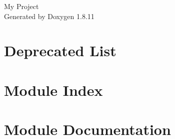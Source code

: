 \documentclass[twoside]{book}
\newcommand{\+}{\discretionary{\mbox{\scriptsize$\hookleftarrow$}}{}{}}
\newcommand{\clearemptydoublepage}{%
  \newpage{\pagestyle{empty}\cleardoublepage}%
}
\begin{document}
\hypersetup{pageanchor=false,
             bookmarksnumbered=true,
             pdfencoding=unicode
            }
\begin{titlepage}
\vspace*{7cm}
\begin{center}%
{\Large My Project }\\
\vspace*{1cm}
{\large Generated by Doxygen 1.8.11}\\
\end{center}
\end{titlepage}
\clearemptydoublepage
\tableofcontents
\clearemptydoublepage
{}
\hypersetup{pageanchor=true}

\chapter{Deprecated List}
\label{deprecated}
\hypertarget{deprecated}{}

\chapter{Module Index}

\chapter{Module Documentation}






























































\backmatter
\newpage
{}
\clearemptydoublepage
{}
\printindex
\end{document}
